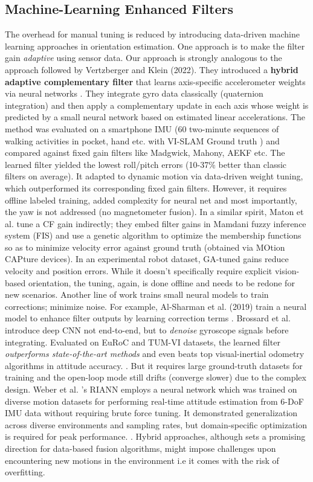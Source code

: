 \documentclass{iutbscthesis}
\begin{document}
\subsection{Machine-Learning Enhanced Filters}
The overhead for manual tuning is reduced by introducing data-driven machine learning approaches in orientation estimation. One approach is to make the filter gain \textit{adaptive} using sensor data. Our approach is strongly analogous to the approach followed by Vertzberger and Klein (2022). They introduced a \textbf{hybrid adaptive complementary filter} that learns axis-specific accelerometer weights via neural networks \cite{vertzberger2022adaptive}. They integrate gyro data classically (quaternion integration) and then apply a complementary update in each axis whose weight is predicted by a small neural network based on estimated linear accelerations. The method was evaluated on a smartphone IMU (60 two-minute sequences of walking activities in pocket, hand etc. with VI-SLAM Ground truth \cite{vertzberger2022adaptive}) and compared against fixed gain filters like Madgwick, Mahony, AEKF etc. The learned filter yielded the lowest roll/pitch errors (10-37\% better than classic filters on average). It adapted to dynamic motion via data-driven weight tuning, which outperformed its corresponding fixed gain filters. However, it requires offline labeled training, added complexity for neural net and most importantly, the yaw is not addressed (no magnetometer fusion). In a similar spirit, Maton et al. tune a CF gain  indirectly; they embed filter gains in Mamdani fuzzy inference system (FIS) and use a genetic algorithm to optimize the membership functions so as to minimize velocity error against ground truth (obtained via MOtion CAPture devices). In an experimental robot dataset, GA-tuned gains reduce velocity and position errors.\cite{maton2024indirectgainGA} While it doesn't specifically require explicit vision-based orientation, the tuning, again, is done offline and needs to be redone for new scenarios. 
Another line of work trains small neural models to train corrections; minimize noise. For example, Al-Sharman et al. (2019) train a neural model to enhance filter outputs by learning correction terms \cite{sharman2019dlcorrection}. Brossard et al. introduce deep CNN not end-to-end, but to \textit{denoise} gyroscope signals before integrating. Evaluated on EuRoC and TUM-VI datasets, the learned filter \textit{outperforms state-of-the-art methods} and even beats top visual-inertial odometry algorithms in attitude accuracy. \cite{denoising}. But it requires large ground-truth datasets for training and the open-loop mode still drifts (converge slower) due to the complex design. Weber et al. 's RIANN employs a neural network which was trained on diverse motion datasets for performing real-time attitude estimation from 6-DoF IMU data without requiring brute force tuning. It demonstrated generalization across diverse environments and sampling rates, but domain-specific optimization is required for peak performance. \cite{weber2020RIANN}. Hybrid approaches, although sets a promising direction for data-based fusion algorithms, might impose challenges upon encountering new motions in the environment i.e it comes with the risk of overfitting.  
\end{document}
